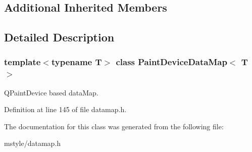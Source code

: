 \subsection*{Additional Inherited Members}


\subsection{Detailed Description}
\subsubsection*{template$<$typename T$>$\newline
class Paint\+Device\+Data\+Map$<$ T $>$}

Q\+Paint\+Device based data\+Map. 

Definition at line 145 of file datamap.\+h.



The documentation for this class was generated from the following file\+:\begin{DoxyCompactItemize}
\item 
mstyle/datamap.\+h\end{DoxyCompactItemize}
